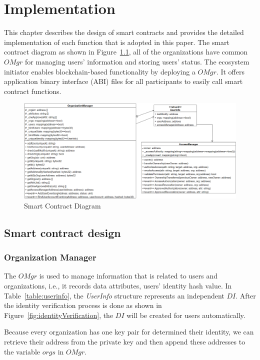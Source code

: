 \chapter{Implementation} 
\label{chapter:implementation}
This chapter describes the design of smart contracts and provides the detailed implementation of each function that is adopted in this paper. The smart contract diagram as shown in Figure~\ref{fig:smart_contract_diagram},  all of the organizations have common \(OMgr\) for managing users' information and storing users' status. The ecosystem initiator enables blockchain-based functionality by deploying a \(OMgr\). It offers application binary interface (ABI) files for all participants to easily call smart contract functions.

\begin{figure}[hb]
    \centering
    \includegraphics[height=!,width=1\linewidth,keepaspectratio=true]{figures/smart_contract_diagram.png}
    \caption{{\footnotesize Smart Contract Diagram}}
    \label{fig:smart_contract_diagram}
\end{figure}
\section{Smart contract design}
\subsection*{Organization Manager}
The \(OMgr\) is used to manage information that is related to users and organizations, i.e., it records data attributes, users' identity hash value. In Table~\ref{table:userinfo}, the \textit{UserInfo} structure represents an independent \(DI\). After the identity verification process is done as shown in Figure~\ref{fig:identityVerification}, the \(DI\) will be created for users automatically.\par
Because every organization has one key pair for determined their identity, we can retrieve their address from the private key and then append these addresses to the variable \(orgs\) in \(OMgr\).\par

